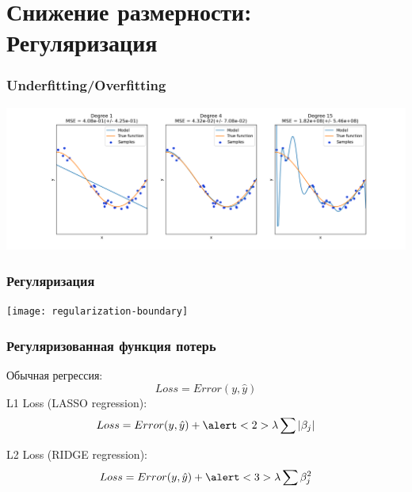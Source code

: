 \documentclass[svgnames]{beamer}
\begin{document}
\section{Снижение размерности: Регуляризация}

\begin{frame}
  \frametitle{Underfitting/Overfitting}
  \includegraphics[width=\textwidth]{under_over}
\end{frame}

\begin{frame}
  \frametitle{Регуляризация}
  \texttt{[image: regularization-boundary]}
\end{frame}

\begin{frame}
  \frametitle{Регуляризованная функция потерь}
  Обычная регрессия:
  \begin{equation}
    Loss = Error(y, \hat{y})
  \end{equation}
  L1 Loss (LASSO regression):
  \begin{equation}
    Loss = Error(y,\hat{y}) + \alert<2>{\lambda\sum|\beta_j|}
  \end{equation}

  L2 Loss (RIDGE regression):
  \begin{equation}
    Loss = Error(y,\hat{y}) + \alert<3>{\lambda\sum\beta_j^2}
  \end{equation}
\end{frame}
\end{document}
